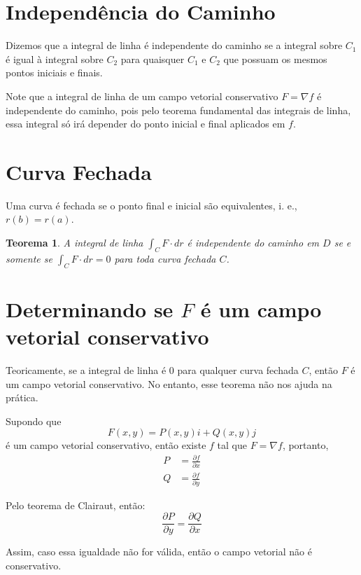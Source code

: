 \documentclass{article}
\newcommand{\PartialDer}[2] {\frac{\partial #1}{\partial #2}}
\newtheorem{theorem}{Teorema}[section]
\begin{document}
    \section{Independência do Caminho}
        Dizemos que a integral de linha é independente do caminho se a integral sobre $C_1$ é igual à integral sobre
        $C_2$ para quaisquer $C_1$ e $C_2$ que possuam os mesmos pontos iniciais e finais.

        Note que a integral de linha de um campo vetorial conservativo $F = \nabla f$ é independente do caminho, pois
        pelo teorema fundamental das integrais de linha, essa integral só irá depender do ponto inicial e final aplicados em $f$.

    \section{Curva Fechada}
        Uma curva é fechada se o ponto final e inicial são equivalentes, i. e., $r(b) = r(a)$.

        \begin{theorem}
            A integral de linha $\int_C F \cdot dr$ é independente do caminho em $D$ se e somente se $\int_C F \cdot dr = 0$
            para toda curva fechada $C$.
        \end{theorem}

    \section{Determinando se $F$ é um campo vetorial conservativo}
        \label{sec:conservativo}
        Teoricamente, se a integral de linha é $0$ para qualquer curva fechada $C$, então $F$ é um campo vetorial conservativo.
        No entanto, esse teorema não nos ajuda na prática.

        Supondo que
        \[
            F(x,y) = P(x,y) i + Q(x,y) j
        \]
        é um campo vetorial conservativo, então existe $f$ tal que $F = \nabla f$, portanto,
        \begin{align*}
            P &= \PartialDer{f}{x}\\
            Q &= \PartialDer{f}{y}
        \end{align*}

        Pelo teorema de Clairaut, então:
        \[
            \PartialDer{P}{y} = \PartialDer{Q}{x}
        \]

        Assim, caso essa igualdade não for válida, então o campo vetorial não é conservativo.
\end{document}
